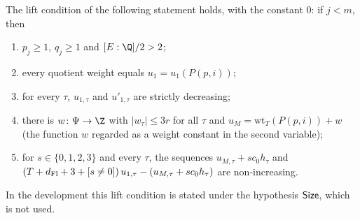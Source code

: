 \begin{proposition}\label{pf:lift2:wtpt}
The lift condition of the following statement holds, with the constant $0$: if $j<m$, then
\begin{enumerate}[label=(\alph*)]
\item $p_j\ge1$, $q_j\ge1$ and $[E:\Q]/2>2$;
\item every quotient weight equals $u_1=u_1(P(p,i))$;
\item for every $\tau$, $u_{1,\tau}$ and $u'_{1,\tau}$ are strictly decreasing;
\item there is $w\colon\Psi\to\Z$ with $|w_\tau|\le3r$ for all $\tau$ and $u_M=\mathrm{wt}_T(P(p,i))+w$ (the function $w$
regarded as a weight constant in the second variable);
\item for $s\in\{0,1,2,3\}$ and every $\tau$, the sequences $u_{M,\tau}+sc_0h_\tau$ and
$(T+d_{\mathrm{Fl}}+3+[s\ne0])\,u_{1,\tau}-(u_{M,\tau}+sc_0h_\tau)$ are non-increasing.
\end{enumerate}
In the development this lift condition is stated under the hypothesis $\mathsf{Size}$, which is not used.
\end{proposition}

